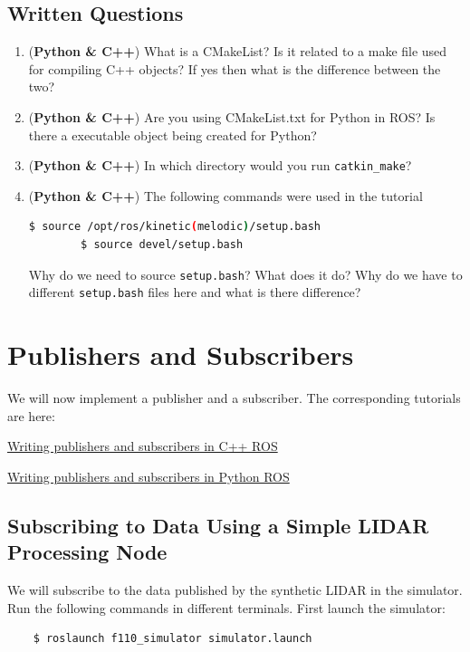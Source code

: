 \documentclass[letta4 paper]{article}
\numberwithin{equation}{section}
\newcommand{\0}{\mathbf{0}}
\begin{document}
	\subsection{Written Questions}
	\begin{enumerate}
		\item (\textbf{Python \& C++}) What is a CMakeList? Is it related to a make file used for compiling C++ objects? If yes then what is the difference between the two?
		\item (\textbf{Python \& C++}) Are you using CMakeList.txt for Python in ROS? Is there a executable object being created for Python? 
		\item (\textbf{Python \& C++}) In which directory would you run \texttt{catkin\_make}? 
		\item (\textbf{Python \& C++}) The following commands were used in the tutorial
		
		\begin{lstlisting}[language=bash]
		$ source /opt/ros/kinetic(melodic)/setup.bash
		$ source devel/setup.bash
		\end{lstlisting}

		Why do we need to source \texttt{setup.bash}? What does it do? Why do we have to different \texttt{setup.bash} files here and what is there difference?
		
	\end{enumerate}

	\section{Publishers and Subscribers}
	We will now implement a publisher and a subscriber. The corresponding tutorials are here:
	
	\href{http://wiki.ros.org/ROS/Tutorials/WritingPublisherSubscriber\%28c\%2B\%2B\%29}{Writing publishers and subscribers in C++ ROS}
		
	\href{http://wiki.ros.org/ROS/Tutorials/WritingPublisherSubscriber\%28python\%29}{Writing publishers and subscribers in Python ROS}
			
	\subsection{Subscribing to Data Using a Simple LIDAR Processing Node}
	We will subscribe to the data published by the synthetic LIDAR in the simulator. Run the following commands in different terminals. First launch the simulator:
	
	\begin{lstlisting}
	$ roslaunch f110_simulator simulator.launch
	\end{lstlisting}{}
	
\end{document}
